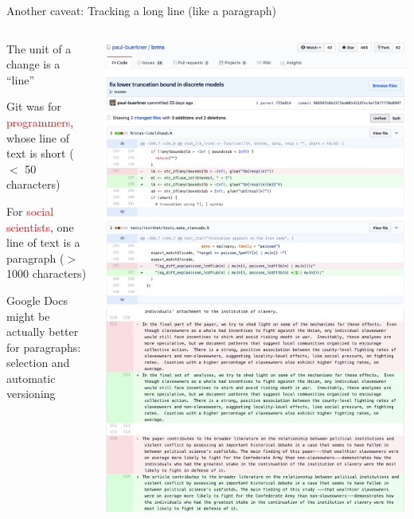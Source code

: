 \documentclass[ignorenonframetext,notes, 10pt, aspectratio=169]{beamer}
\begin{document}
\begin{frame}{Another caveat: Tracking a long line (like a paragraph)}
\begin{columns}[T]
\begin{column}{0.4\textwidth}
\begin{wideitemize}
\item<1-> The unit of a change is a ``line''
\item<1-> Git was for \textcolor{red}{programmers}, whose line of text is short ($<$ 50 characters)
\item<2-> For \textcolor{red}{social scientists}, one line of text is a paragraph ($>$ 1000 characters)
\item<3-> Google Docs might be actually better for paragraphs: selection and automatic versioning
\end{wideitemize}
\end{column}
\begin{column}{0.6\textwidth}
\begin{overprint}
\includegraphics[width = \linewidth]{software-dev-diff.png}
\includegraphics[width = \linewidth]{long-diff-2.png}

\end{overprint}
\end{column}
\end{columns}
\end{frame}
\end{document}
